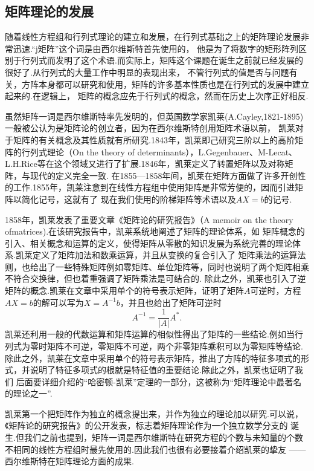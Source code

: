 \subsection{矩阵理论的发展}
随着线性方程组和行列式理论的建立和发展，在行列式基础之上的矩阵理论发展非常迅速.``j矩阵''这个词是由西尔维斯特首先使用的，
他是为了将数字的矩形阵列区别于行列式而发明了这个术语.而实际上，矩阵这个课题在诞生之前就已经发展的很好了.从行列式的大量工作中明显的表现出来，
不管行列式的值是否与问题有关，方阵本身都可以研究和使用，矩阵的许多基本性质也是在行列式的发展中建立起来的.在逻辑上，
矩阵的概念应先于行列式的概念，然而在历史上次序正好相反.

虽然矩阵一词是西尔维斯特率先发明的，但英国数学家凯莱(A.Cayley,1821-1895)一般被公认为是矩阵论的创立者，因为在西尔维斯特创用矩阵术语以前，
凯莱对于矩阵的有关概念及其性质就有所研究.1843年，凯莱即己研究三阶以上的高阶矩阵的行列式理论（On the theory of
determinants），L.Gegenbauer、M-Lecat、L.H.Rice等在这个领域又进行了扩展.1846年，凯莱定义了转置矩阵以及对称矩阵，与现代的定义完全一致.
在1855—1858年间，凯莱在矩阵方面做了许多开创性的工作.1855年，凯莱注意到在线性方程组中使用矩阵是非常芳便的，因而引进矩阵以简化记号，这就有了
现在我们使用的阶梯矩阵等术语以及$AX=b$的记号.

1858年，凯莱发表了重要文章《矩阵论的研究报告》（A memoir on the theory ofmatrices).在该研究报告中，凯莱系统地阐述了矩阵的理论体系，如
矩阵概念的引入、相关概念和运算的定义，使得矩阵从零散的知识发展为系统完善的理论体系.凯莱定义了矩阵加法和数乘运算，并且从变换的复合引入了
矩阵乘法的运算法则，也给出了一些特殊矩阵例如零矩阵、单位矩阵等，同时也说明了两个矩阵相乘不符合交换律，但也着重强调了矩阵乘法是可结合的.
除此之外，凯莱也引入了逆矩阵的概念.凯莱在文章中采用单个的符号表示矩阵，证明了矩阵$A$可逆时，方程$AX=b$的解可以写为$X=A^{-1}b$，并且也给出了矩阵可逆时
\[A^{-1}=\frac{1}{|A|}A^*.\]
凯莱还利用一般的代数运算和矩阵运算的相似性得出了矩阵的一些结论.例如当行列式为零时矩阵不可逆，零矩阵不可逆，两个非零矩阵乘积可以为零矩阵等结论.
除此之外，凯莱在文章中采用单个的符号表示矩阵，推出了方阵的特征多项式的形式，并说明了特征多项式的根就是特征值的重要结论.除此之外，凯莱也证明了我们
后面要详细介绍的``哈密顿-凯莱''定理的一部分，这被称为``矩阵理论中最著名的理论之一''.

凯莱第一个把矩阵作为独立的概念提出来，并作为独立的理论加以研究.可以说，《矩阵论的研究报告》的公开发表，标志着矩阵理论作为一个独立数学分支的
诞生.但我们之前也提到，矩阵一词是西尔维斯特在研究方程的个数与未知量的个数不相同的线性方程组时最先使用的.因此我们也很有必要接着介绍凯莱的挚友
——西尔维斯特在矩阵理论方面的成果.

